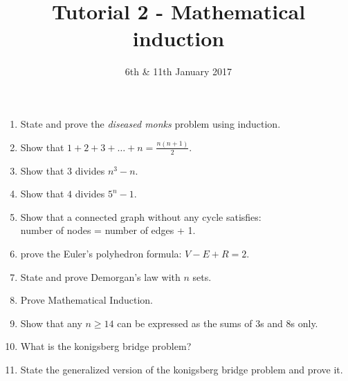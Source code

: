 \documentclass[a4paper]{article}
\title{Tutorial 2 - Mathematical induction}
\date{6th \& 11th January 2017}
\begin{document}
\maketitle
\begin{enumerate}
\item State and prove the {\it diseased monks} problem using induction.
\item Show that $1+2+3+\dots+n=\frac{n(n+1)}{2}$.
\item Show that $3$ divides $n^3-n$.
\item Show that $4$ divides $5^n-1$.
\item Show that a connected graph without any cycle satisfies:\\ number of nodes = number of edges + 1.
\item prove the Euler's polyhedron formula: $V-E+R=2$.
\item State and prove Demorgan's law with $n$ sets.
\item Prove Mathematical Induction.
\item Show that any $n\geq 14$ can be expressed as the sums of 3s and 8s only.
\item What is the konigsberg bridge problem?
\item State the generalized version of the konigsberg bridge problem and prove it.
\end{enumerate}
\end{document}
